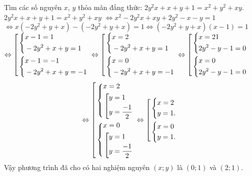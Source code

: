 \begin{ex}%
Tìm các số nguyên $x$, $y$ thỏa mãn đẳng thức: $2y^2x + x + y + 1 = x^2 + y^2 + xy$. 
\loigiai
    {
$2y^2x + x + y + 1 = x^2 + y^2 + xy$ $\Leftrightarrow x^2-2y^2x+xy+2y^2-x-y=1$\\
$\Leftrightarrow x\left(-2y^2+y+x\right)-\left(-2y^2+y+x\right)=1 \Leftrightarrow (-2y^2+y+x)(x-1)=1$\\
$\Leftrightarrow \hoac{&\heva{&x-1=1\\&-2y^2+x+y=1}\\&\heva{&x-1=-1\\&-2y^2+x+y=-1}}$ $\Leftrightarrow \hoac{&\heva{&x=2\\&-2y^2+x+y=1}\\&\heva{&x=0\\&-2y^2+x+y=-1}}$ $\Leftrightarrow \hoac{&\heva{&x=21\\&2y^2-y-1=0}\\&\heva{&x=0\\&2y^2-y-1=0}}$ 
$$\Leftrightarrow \hoac{&\heva{&x=2\\&\hoac{&y=1\\&y=\dfrac{-1}{2}}}\\&\heva{&x=0\\&\hoac{&y=1\\&y=\dfrac{-1}{2}}}}
\Leftrightarrow \hoac{&\heva{&x=2\\&y=1.}\\&\heva{&x=0\\&y=1.}}$$
Vậy phương trình đã cho có hai nghiệm nguyên $(x; y)$ là $(0; 1)$ và $(2; 1)$.
	}
\end{ex}


